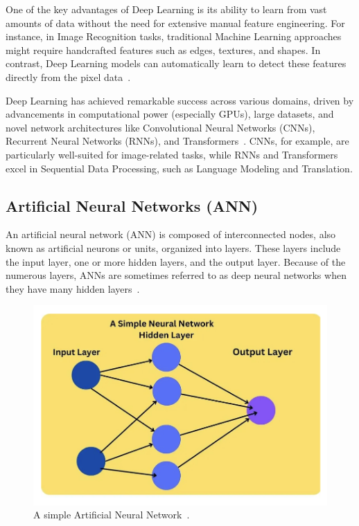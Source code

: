\documentclass[12pt,a4paper]{report}
\begin{document}
One of the key advantages of Deep Learning is its ability to learn from vast amounts of data without the need for extensive manual feature engineering. For instance, in Image Recognition tasks, traditional Machine Learning approaches might require handcrafted features such as edges, textures, and shapes. In contrast, Deep Learning models can automatically learn to detect these features directly from the pixel data~\cite{deeplearning}.

Deep Learning has achieved remarkable success across various domains, driven by advancements in computational power (especially GPUs), large datasets, and novel network architectures like Convolutional Neural Networks (CNNs), Recurrent Neural Networks (RNNs), and Transformers~\cite{vaswani2017attention}. CNNs, for example, are particularly well-suited for image-related tasks, while RNNs and Transformers~\cite{vaswani2017attention} excel in Sequential Data Processing, such as Language Modeling and Translation.
\subsection{Artificial Neural Networks (ANN)}
An artificial neural network (ANN) is composed of interconnected nodes, also known as artificial neurons or units, organized into layers. These layers include the input layer, one or more hidden layers, and the output layer. Because of the numerous layers, ANNs are sometimes referred to as deep neural networks when they have many hidden layers~\cite{ann}.

\begin{figure}[th]
  \centering
  \includegraphics[scale=0.52]{./pics/ann.png}
  \caption[A simple Artificial Neural Network]{A simple Artificial Neural Network~\cite{ann}.}
  \label{fig:pi4}
\end{figure}
\end{document}
